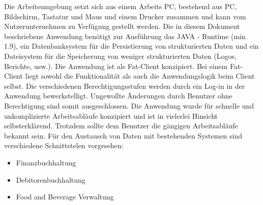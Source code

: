 \documentclass[../Pflichtenheft.tex]{subfiles}
\begin{document}
    Die Arbeitsumgebung setzt sich aus einem Arbeits PC, bestehend aus PC, Bildschirm, Tastatur
    und Maus und einem Drucker zusammen und kann vom Nutzerunternehmen zu Verfügung gestellt werden.
    Die in diesem Dokument beschriebene Anwendung benötigt zur Ausführung das JAVA - Runtime (min 1.9), ein
    Datenbanksystem für die Persistierung von strukturierten Daten und ein Dateisystem für die Speicherung von
    weniger strukturierten Daten (Logos, Berichte, usw.).
    Die Anwendung ist als Fat-Client konzipiert. Bei einem Fat-Client liegt sowohl die Funktionalität als auch die Anwendungslogik beim Client selbst.
    Die verschiedenen Berechtigungsstufen werden durch ein Log-in in der Anwendung bewerkstelligt. Ungewollte Änderungen
    durch Benutzer ohne Berechtigung sind somit ausgeschlossen.
    Die Anwendung wurde für schnelle und unkomplizierte Arbeitsabläufe konzipiert und ist in vielerlei Hinsicht selbsterklärend.
    Trotzdem sollte dem Benutzer die gängigen Arbeitsabläufe bekannt sein.
    Für den Austausch von Daten mit bestehenden Systemen sind verschiedene Schnittstelen vorgesehen:
    \begin{itemize}
        \item Finanzbuchhaltung
        \item Debitorenbuchhaltung
        \item Food and Beverage Verwaltung
    \end{itemize}
\end{document}

